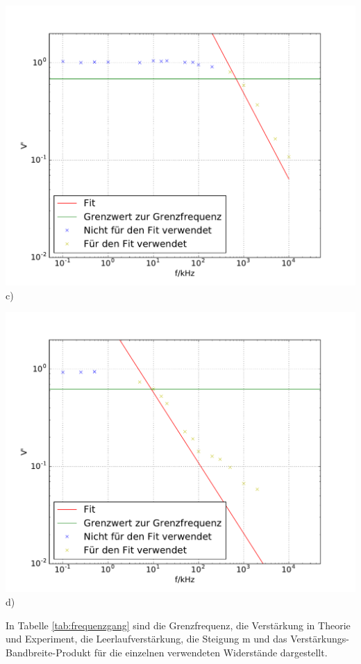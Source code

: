 \documentclass[]{scrartcl}
\begin{document}
\begin{minipage}[t]{0.6\textwidth}
		\includegraphics[width=\textwidth]{images/plot3.pdf}
		\centering
		c)
\end{minipage}
\begin{minipage}[t]{0.6\textwidth}
		\includegraphics[width=\textwidth]{images/plot4.pdf}
		\centering
		d)
\end{minipage}
\label{fig:frequenzgang}
\vspace{0.5cm}
In Tabelle \ref{tab:frequenzgang} sind die Grenzfrequenz, die Verstärkung in Theorie und Experiment, die Leerlaufverstärkung, die Steigung m und das Verstärkungs-Bandbreite-Produkt für die einzelnen verwendeten Widerstände dargestellt. \\
\end{document}
